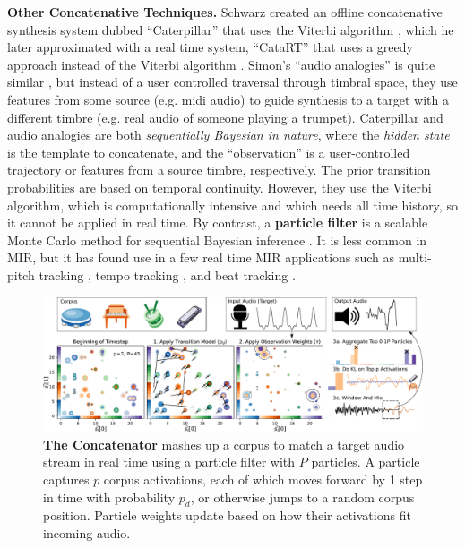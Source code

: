 \documentclass{article}
\begin{document}
\textbf{Other Concatenative Techniques.} Schwarz created an offline concatenative synthesis system dubbed ``Caterpillar'' that uses the Viterbi algorithm \cite{schwarz2000system}, which he later approximated with a real time system, ``CataRT'' that uses a greedy approach instead of the Viterbi algorithm \cite{schwarz2006real, schwarz2008principles}.  Simon's ``audio analogies'' is quite similar \cite{simon2005audio}, but instead of a user controlled traversal through timbral space, they use features from some source (e.g. midi audio) to guide synthesis to a target with a different timbre (e.g. real audio of someone playing a trumpet). Caterpillar and audio analogies are both {\em sequentially Bayesian in nature}, where the {\em hidden state} is the template to concatenate, and the ``observation'' is a user-controlled trajectory or features from a source timbre, respectively.  The prior transition probabilities are based on temporal continuity.  However, they use the Viterbi algorithm, which is computationally intensive and which needs all time history, so it cannot be applied in real time.  By contrast, a \textbf{particle filter} is a scalable Monte Carlo method for sequential Bayesian inference \cite{metropolis1949monte, doucet2000sequential, thrun2002probabilistic}.  It is less common in MIR, but it has found use in a few real time MIR applications such as multi-pitch tracking \cite{duan2011state}, tempo tracking \cite{cemgil2003monte, hainsworth2004particle}, and beat tracking \cite{heydari2021don}.  

\begin{figure}[h]
	\centering
	\includegraphics[width=\textwidth]{figs/BlockDGM.pdf}%
	\caption{\textbf{The Concatenator} mashes up a corpus to match a target audio stream in real time using a particle filter with $P$ particles.  A particle captures $p$ corpus activations, each of which moves forward by 1 step in time with probability $p_d$, or otherwise jumps to a random corpus position. Particle weights update based on how their activations fit incoming audio.   }
	\label{fig:BlockDGM}
\end{figure}
\end{document}
